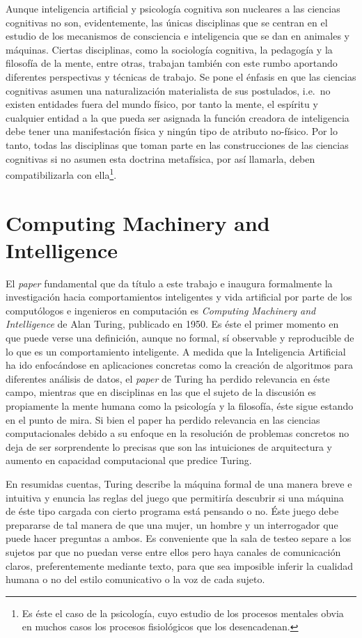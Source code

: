\documentclass[12pt]{memoir}
\begin{document}
Aunque inteligencia artificial y psicología cognitiva son nucleares a las ciencias cognitivas no son, evidentemente, las únicas disciplinas que se centran en el estudio de los mecanismos de consciencia e inteligencia que se dan en animales y máquinas. Ciertas disciplinas, como la sociología cognitiva, la pedagogía y la filosofía de la mente, entre otras, trabajan también con este rumbo aportando diferentes perspectivas y técnicas de trabajo. Se pone el énfasis en que las ciencias cognitivas asumen una naturalización materialista de sus postulados, i.e.\ no existen entidades fuera del mundo físico, por tanto la mente, el espíritu y cualquier entidad a la que pueda ser asignada la función creadora de inteligencia debe tener una manifestación física y ningún tipo de atributo no-físico. Por lo tanto, todas las disciplinas que toman parte en las construcciones de las ciencias cognitivas si no asumen esta doctrina metafísica, por así llamarla, deben compatibilizarla con ella\footnote{Es éste el caso de la psicología, cuyo estudio de los procesos mentales obvia en muchos casos los procesos fisiológicos que los desencadenan.}.

\section{Computing Machinery and Intelligence}

El \textit{paper} fundamental que da título a este trabajo e inaugura formalmente la investigación hacia comportamientos inteligentes y vida artificial por parte de los computólogos e ingenieros en computación es \textit{Computing Machinery and Intelligence} de Alan Turing, publicado en 1950. Es éste el primer momento en que puede verse una definición, aunque no formal, sí observable y reproducible de lo que es un comportamiento inteligente. A medida que la Inteligencia Artificial ha ido enfocándose en aplicaciones concretas como la creación de algoritmos para diferentes análisis de datos, el \textit{paper} de Turing ha perdido relevancia en éste campo, mientras que en disciplinas en las que el sujeto de la discusión es propiamente la mente humana como la psicología y la filosofía, éste sigue estando en el punto de mira. Si bien el paper ha perdido relevancia en las ciencias computacionales debido a su enfoque en la resolución de problemas concretos no deja de ser sorprendente lo precisas que son las intuiciones de arquitectura y aumento en capacidad computacional que predice Turing.

En resumidas cuentas, Turing describe la máquina formal de una manera breve e intuitiva y enuncia las reglas del juego que permitiría descubrir si una máquina de éste tipo cargada con cierto programa está pensando o no. Éste juego debe prepararse de tal manera de que una mujer, un hombre y un interrogador que puede hacer preguntas a ambos. Es conveniente que la sala de testeo separe a los sujetos par que no puedan verse entre ellos pero haya canales de comunicación claros, preferentemente mediante texto, para que sea imposible inferir la cualidad humana o no del estilo comunicativo o la voz de cada sujeto. 
\end{document}
